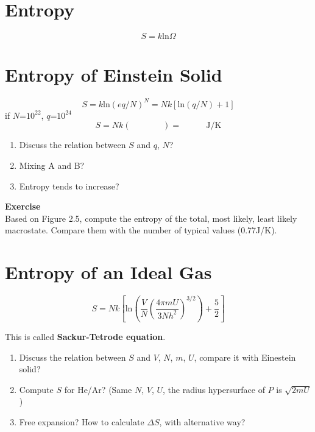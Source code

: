 


\section{Entropy}
\begin{equation} \label{entropy} 
S = k \text{ln}\Omega 
\end{equation}

\section{Entropy of Einstein Solid}
\begin{equation} \label{entropy} 
S = k\text{ln}(eq/N)^N = Nk[\text{ln}(q/N)+1]
\end{equation}
if $N$=\textrm{$10^{22}$}, $q$=\textrm{$10^{24}$}
\begin{equation} \label{entropy} 
S = Nk(~~~~~~~~~~~~~~~~~)= ~~~~~~~~~~~~~\text{J/K} 
\end{equation}

\begin{enumerate}
\item Discuss the relation between $S$ and $q$, $N$?
\item Mixing A and B?
\item Entropy tends to increase?
\end{enumerate}

{\bf Exercise} \\
Based on Figure 2.5, compute the entropy of the total, most likely, least likely macrostate. Compare them with the number of typical values (0.77J/K).

\section{Entropy of an Ideal Gas}
\begin{equation} \label{entropy} 
S = Nk[\text{ln}(\frac{V}{N} (\frac{4\pi m U}{3Nh^2})^{3/2}) + \frac{5}{2}]
\end{equation}

This is called \textbf{Sackur-Tetrode equation}.

\begin{enumerate}
\item Discuss the relation between $S$ and $V$, $N$, $m$, $U$, compare it with Einestein solid?
\item Compute $S$ for He/Ar? (Same $N$, $V$, $U$, the radius hypersurface of $P$ is $\sqrt{2mU}$ ) 
\item Free expansion? How to calculate $\Delta{S}$, with alternative way?
\end{enumerate}

